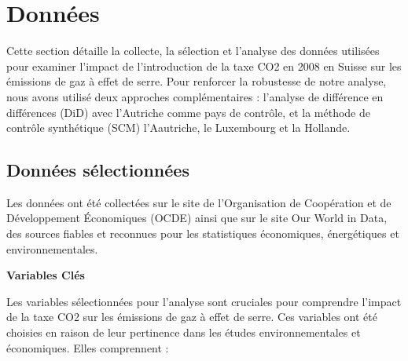 \section{Données}
\label{sec:data}
Cette section détaille la collecte, la sélection et l'analyse des données utilisées pour examiner l'impact de l'introduction de la taxe CO2 en 2008 en Suisse sur les émissions de gaz à effet de serre. Pour renforcer la robustesse de notre analyse, nous avons utilisé deux approches complémentaires : l'analyse de différence en différences (DiD) avec l'Autriche comme pays de contrôle, et la méthode de contrôle synthétique (SCM) l'Aautriche, le Luxembourg et la Hollande.


\subsection{Données sélectionnées}
\label{subsec:data_selection}


Les données ont été collectées sur le site de l'Organisation de Coopération et de Développement Économiques (OCDE) ainsi que sur le site Our World in Data, des sources fiables et reconnues pour les statistiques économiques, énergétiques et environnementales.

\textbf{Variables Clés}

Les variables sélectionnées pour l'analyse sont cruciales pour comprendre l'impact de la taxe CO2 sur les émissions de gaz à effet de serre. Ces variables ont été choisies en raison de leur pertinence dans les études environnementales et économiques.  Elles comprennent :

